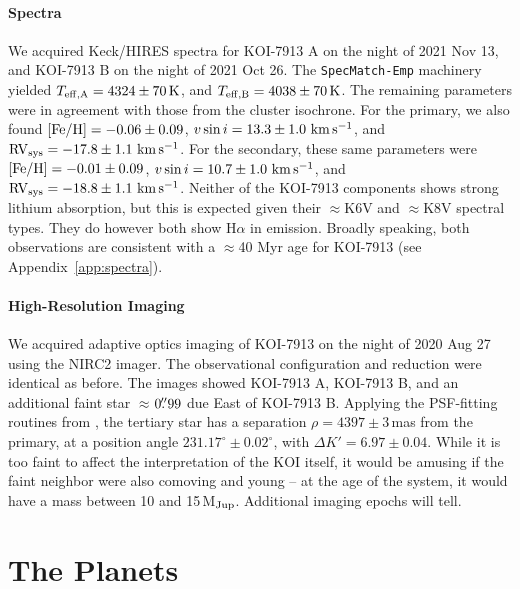 \documentclass[12pt,twocolumn]{aastex63}
\newcommand{\mkms}{{\rm \,km\,s^{-1}}}  %
\begin{document}
\paragraph{Spectra}
We acquired Keck/HIRES spectra for KOI-7913 A on the night of 2021 Nov
13, and KOI-7913 B on the night of 2021 Oct 26.  The
\texttt{SpecMatch-Emp} machinery yielded $T_{\rm eff,A} = 4324 \pm
70\,{\rm K}$, and $T_{\rm eff,B} = 4038 \pm 70\,{\rm K}$.  The
remaining parameters were in agreement with those from the cluster
isochrone.  For the primary, we also found $[{\rm Fe/H}]= -0.06 \pm
0.09$, $v\sin i = 13.3 \pm 1.0\,\mkms$, and ${\rm RV}_{\rm sys} =
-17.8 \pm 1.1\,\mkms$.  For the secondary, these same parameters were
$[{\rm Fe/H}]= -0.01 \pm 0.09$, $v\sin i = 10.7 \pm 1.0\,\mkms$, and
${\rm RV}_{\rm sys} = -18.8 \pm 1.1\,\mkms$.  Neither of the KOI-7913
components shows strong lithium absorption, but this is expected given
their $\approx$K6V and $\approx$K8V spectral types.  They do however
both show H$\alpha$ in emission.  Broadly speaking, both observations
are consistent with a $\approx$40 Myr age for KOI-7913 (see
Appendix~\ref{app:spectra}).


\paragraph{High-Resolution Imaging}
We acquired adaptive optics imaging of KOI-7913 on the night of 2020
Aug 27 using the NIRC2 imager.  The observational configuration and
reduction were identical as before.  The images showed KOI-7913 A,
KOI-7913 B, and an additional faint star $\approx$$0\mbox{$.\!\!^{\prime\prime}$}99$ due East
of KOI-7913 B.  Applying the PSF-fitting routines from
\citet{kraus_impact_2016}, the tertiary star has a separation $\rho =
4397 \pm 3$\,mas from the primary, at a position angle $231.17^\circ
\pm 0.02^\circ$, with $\Delta K' = 6.97 \pm 0.04$.  While it is too
faint to affect the interpretation of the KOI itself, it would be
amusing if the faint neighbor were also comoving and young -- at the
age of the system, it would have a mass between 10 and
15\,M$_{\rm Jup}$.  Additional imaging epochs will tell.




\section{The Planets}
\label{sec:planets}
\end{document}
